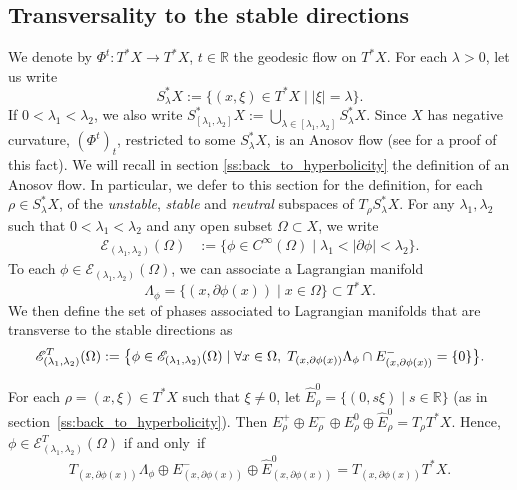 \documentclass[JEP,XML,SOM,Unicode,published]{cedram}
\let\mathcal\mathscr
\let\sep\mid
\theoremstyle{plain}
\theoremstyle{definition}
\newcommand{\R}{\mathbb{R}}
\def\calE{\mathcal{E}}
\begin{document}
\subsection{Transversality to the stable directions}\label{ss:Hyp}

We denote by $\Phi^t:T^*X\to T^*X$, $t\in\R$ the geodesic flow on $T^*X$. For each $\lambda > 0$, let us write
\[
S_\lambda^*X := \{ (x,\xi)\in T^*X \sep |\xi| = \lambda\}.
\]
If $0<\lambda_1<\lambda_2$, we also write $S^*_{[\lambda_1,\lambda_2]}X := \bigcup_{\lambda \in [\lambda_1, \lambda_2]} S_\lambda^*X$. Since $X$ has negative curvature, $(\Phi^t)_t$, restricted to some $S_\lambda^*X$, is an Anosov flow (see \cite{Ebe} for a proof of this fact). We will recall in section \ref{ss:back_to_hyperbolicity} the definition of an Anosov flow. In particular, we defer to this section for the definition, for each $\rho\in S_\lambda^*X$, of the \emph{unstable}, \emph{stable} and \emph{neutral} subspaces of $T_\rho S_\lambda^*X$. For any $\lambda_1,\lambda_2$ such that $0<\lambda_1<\lambda_2$ and any open subset $\Omega\subset X$, we write
\begin{equation}\label{eq:SpacePhases}
\begin{aligned}
\mathcal{E}_{(\lambda_1,\lambda_2)}(\Omega)&:= \{ \phi\in C^\infty(\Omega) \sep \lambda_1< |\partial \phi | < \lambda_2 \}.
\end{aligned}
\end{equation}
To each $\phi\in \mathcal{E}_{(\lambda_1,\lambda_2)}(\Omega)$, we can associate a Lagrangian manifold
\[
\Lambda_\phi=\{(x,\partial\phi(x))\sep x\in\Omega\}\subset T^*X.
\]
We then define the set of phases associated to Lagrangian manifolds that are transverse to the stable directions as
\begin{equation}\label{eq:TransversePhases}
\mathcal{E}^{T}_{(\lambda_1,\lambda_2)}(\Omega) :=\big{\{} \phi \in \mathcal{E}_{(\lambda_1,\lambda_2)}(\Omega) \sep\forall x\in \Omega,\; T_{(x,\partial \phi(x))} \Lambda_\phi \cap E^-_{(x,\partial \phi(x))} = \{0\} \big{\}}.
\end{equation}

For each $\rho=(x,\xi)\in T^*X$ such that $\xi\neq 0$, let $\hat{E}^0_\rho=\{(0,s\xi)\sep s\in\R\}$ (as in sec\-tion~\ref{ss:back_to_hyperbolicity}). Then $E^+_\rho\oplus E^-_\rho\oplus E^0_\rho \oplus \hat{E}^0_\rho= T_\rho T^*X$. Hence, $\phi\in\calE^T_{(\lambda_1,\lambda_2)}(\Omega)$ if and only~if
\[
T_{(x,\partial\phi(x))}\Lambda_\phi\oplus E^-_{(x,\partial\phi(x))}\oplus \hat{E}^0_{(x,\partial\phi(x))}=T_{(x,\partial\phi(x))}T^*X.
\]
\end{document}

